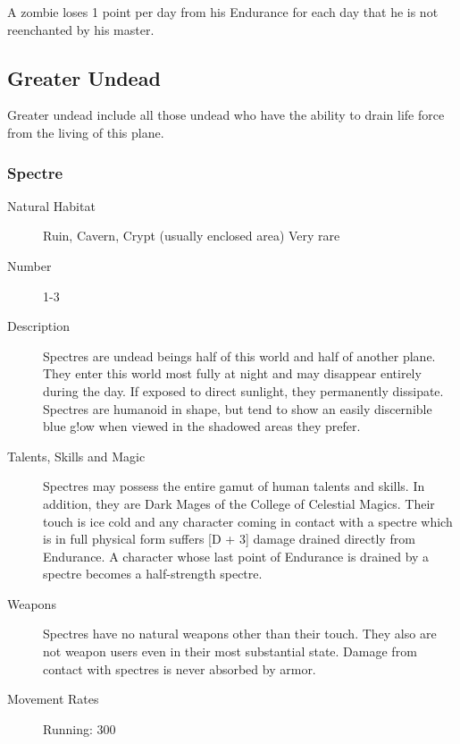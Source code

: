 \begin{multicols*}{2}
\begin{description}
\setlength\itemsep{0pt}

\item[Comments] A zombie loses 1 point per day from his Endurance for each
day that he is not reenchanted by his master.

\end{description}

\subsection{Greater Undead}
Greater undead include all those undead who have the ability to drain
life force from the living of this plane.


\subsubsection{Spectre}

\begin{description}
\item[Natural Habitat] Ruin, Cavern, Crypt (usually enclosed area) Very rare

\item[Number] 1-3

\item[Description] Spectres are undead beings half of this world and half
of another plane. They enter this world most fully at night and may
disappear entirely during the day. If exposed to direct sunlight, they
permanently dissipate. Spectres are humanoid in shape, but tend to
show an easily discernible blue g!ow when viewed in the shadowed areas
they prefer.

\item[Talents, Skills and Magic] Spectres may possess the entire gamut of human talents and
skills. In addition, they are Dark Mages of the College of Celestial
Magics. Their touch is ice cold and any character coming in contact
with a spectre which is in full physical form suffers [D + 3] damage
drained directly from Endurance. A character whose last point of
Endurance is drained by a spectre becomes a half-strength spectre.

\item[Weapons] Spectres have no natural weapons other than their
touch. They also are not weapon users even in their most substantial
state. Damage from contact with spectres is never absorbed by armor.

\item[Movement Rates]  Running: 300


\end{description}
\end{multicols*}
